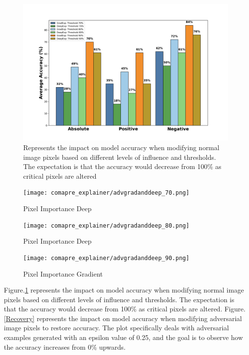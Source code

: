 \documentclass[10pt, conference, a4paper, final]{IEEEtran}
\begin{document}
  \begin{figure}
    \centering
    \includegraphics[width=1\linewidth]{comapre_explainer/correctgradanddeep.png}
    \caption{Represents the impact on model accuracy when modifying normal image pixels based on different levels of influence and thresholds. The expectation is that the accuracy would decrease from 100\% as critical pixels are altered}
    \label{Degradation}
\end{figure}

\begin{figure}[ht]
    \centering
    \begin{minipage}{1\textwidth}
        \centering
        \texttt{[image: comapre\_explainer/advgradanddeep\_70.png]}
        \caption{Pixel Importance Deep}
    \end{minipage}\hfill
    \begin{minipage}{1\textwidth}
        \centering
        \texttt{[image: comapre\_explainer/advgradanddeep\_80.png]}
        \caption{Pixel Importance Deep}
    \end{minipage}\hfill
    \begin{minipage}{1\textwidth}
        \centering
        \texttt{[image: comapre\_explainer/advgradanddeep\_90.png]}
        \caption{Pixel Importance Gradient}
    \end{minipage}
\end{figure}




Figure.\ref{Degradation} represents the impact on model accuracy when modifying normal image pixels based on different levels of influence and thresholds. The expectation is that the accuracy would decrease from 100\% as critical pixels are altered.
Figure.\ref{Recovery} represents the impact on model accuracy when modifying adversarial image pixels to restore accuracy. The plot specifically deals with adversarial examples generated with an epsilon value of 0.25, and the goal is to observe how the accuracy increases from 0\% upwards.
 
\end{document}
